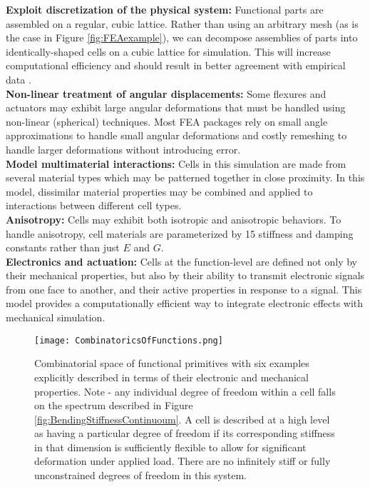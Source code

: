 {\textbf{Exploit discretization of the physical system:} Functional parts are assembled on a regular, cubic lattice.  Rather than using an arbitrary mesh (as is the case in Figure \ref{fig:FEAexample}), we can decompose assemblies of parts into identically-shaped cells on a cubic lattice for simulation.  This will increase computational efficiency and should result in better agreement with empirical data \cite{Calisch2014}.\\

\textbf{Non-linear treatment of angular displacements:} Some flexures and actuators may exhibit large angular deformations that must be handled using non-linear (spherical) techniques.  Most FEA packages rely on small angle approximations to handle small angular deformations and costly remeshing to handle larger deformations without introducing error.\\

\textbf{Model multimaterial interactions:} Cells in this simulation are made from several material types which may be patterned together in close proximity.  In this model, dissimilar material properties may be combined and applied to interactions between different cell types.\\

\textbf{Anisotropy:} Cells may exhibit both isotropic and anisotropic behaviors.  To handle anisotropy, cell materials are parameterized by 15 stiffness and damping constants rather than just $E$ and $G$.\\

\textbf{Electronics and actuation:} Cells at the function-level are defined not only by their mechanical properties, but also by their ability to transmit electronic signals from one face to another, and their active properties in response to a signal.  This model provides a computationally efficient way to integrate electronic effects with mechanical simulation. \\

\begin{figure}
  \texttt{[image: CombinatoricsOfFunctions.png]}
  \caption{Combinatorial space of functional primitives with six examples explicitly described in terms of their electronic and mechanical properties.  Note - any individual degree of freedom within a cell falls on the spectrum described in Figure \ref{fig:BendingStiffnessContinuoum}.  A cell is described at a high level as having a particular degree of freedom if its corresponding stiffness in that dimension is sufficiently flexible to allow for significant deformation under applied load.  There are no infinitely stiff or fully unconstrained degrees of freedom in this system.}
  \label{fig:CombinatoricsOfFunctions}
\end{figure}

}
